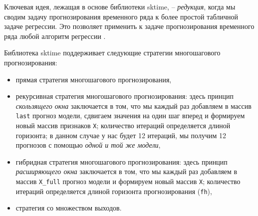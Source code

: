\documentclass[%
	11pt,
	a4paper,
	utf8,
		]{article}
\begin{document}
Ключевая идея, лежащая в основе библиотеки sktime, -- \emph{редукция}, когда мы сводим задачу прогнозирования временного ряда к более простой табличной задаче регрессии. Это позволяет применить к задаче прогнозирования временного ряда любой алгоритм регрессии \cite[]{gruzdev:time-series-2022}.

Библиотека sktime поддерживает следующие стратегии многошагового прогнозирования:
\begin{itemize}
	\item прямая стратегия многошагового прогнозирования,
	
	\item рекурсивная стратегия многошагового прогнозирования: здесь принцип \emph{скользящего окна} заключается в том, что мы каждый раз добавляем в массив \verb|last| прогноз модели, сдвигаем значения на один шаг вперед и формируем новый массив признаков \verb|X|; количество итераций определяется длиной горизонта; в данном случае у нас будет 12 итераций, мы получим 12 прогнозов с помощью \emph{одной и той же модели}, 
	
	\item гибридная стратегия многошагового прогнозирования: здесь принцип \emph{расширяющего окна} заключается в том, что мы каждый раз добавляем в массив \verb|X_full| прогноз модели и формируем новый массив \verb|X|; количество итераций определяется длиной горизонта прогнозирования (\verb|fh|),
	
	\item стратегия со множеством выходов.
\end{itemize}







\begin{thebibliography}{99}
    
	
	
\end{thebibliography}


\end{document}
